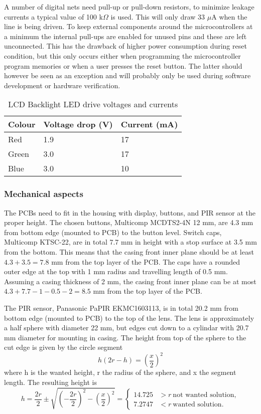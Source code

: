 A number of digital nets need pull-up or pull-down resistors, to
minimize leakage currents a typical value of 100 k$\Omega$ is
used. This will only draw 33 $\mu$A when the line is being driven. To
keep external components around the microcontrollers at a minimum the
internal pull-ups are enabled for unused pins and these are left
unconnected. This has the drawback of higher power consumption during
reset condition, but this only occurs either when programming the
microcontroller program memories or when a user presses the reset
button. The latter should however be seen as an exception and will
probably only be used during software development or hardware
verification.


\begin{table}
\begin{tabular}{|l|l|l|}
\hline
Colour & Voltage drop (V) & Current (mA)\\
\hline
Red & 1.9 & 17\\
Green & 3.0 & 17\\
Blue & 3.0 & 10\\
\hline
\end{tabular}
\caption{LCD Backlight LED drive voltages and currents}
\label{tab:backlightleds}
\end{table}


\subsubsection{Mechanical aspects}
The PCBs need to fit in the housing with display, buttons, and PIR
sensor at the proper height. The chosen buttons, Multicomp MCDTS2-4N
12 mm, are 4.3 mm from bottom edge (mounted to PCB) to the button
level. Switch caps, Multicomp KTSC-22, are in total 7.7 mm in height
with a stop surface at 3.5 mm from the bottom. This means that the
casing front inner plane should be at least $4.3+3.5=7.8$ mm from the
top layer of the PCB. The caps have a rounded outer edge at the top
with 1 mm radius and travelling length of 0.5 mm. Assuming a casing
thickness of 2 mm, the casing front inner plane can be at most
$4.3+7.7-1-0.5-2=8.5$ mm from the top layer of the PCB.

The PIR sensor, Panasonic PaPIR EKMC1603113, is in total 20.2 mm from
bottom edge (mounted to PCB) to the top of the lens. The lens is
approximately a half sphere with diameter 22 mm, but edges cut down to
a cylindar with 20.7 mm diameter for mounting in casing. The height
from top of the sphere to the cut edge is given by the circle segment
\begin{equation}
h(2r-h)=\left(\frac{x}{2}\right)^2
\end{equation}
where h is the wanted height, r the radius of the sphere, and x the
segment length. The resulting height is
\begin{equation}
h=\frac{2r}{2}\pm\sqrt{\left(-\frac{2r}{2}\right)^2-\left(\frac{x}{2}\right)^2}=
\begin{cases}
14.725 & >r ~\text{not wanted solution},\\
7.2747 & <r ~\text{wanted solution}.
\end{cases}
\end{equation}

